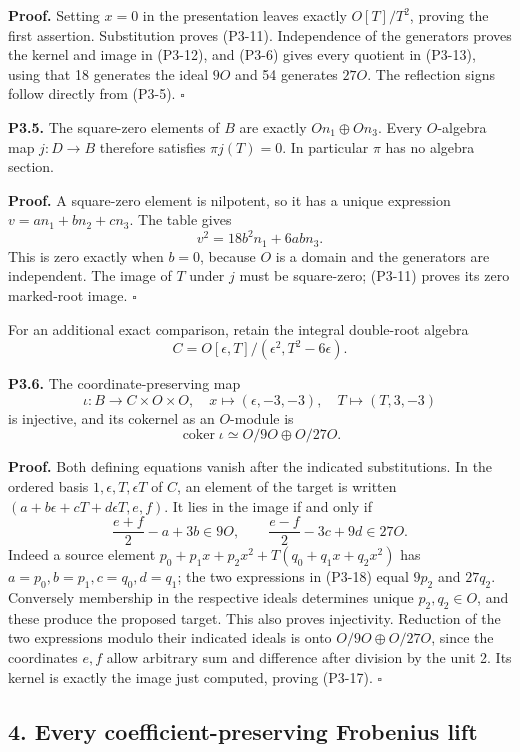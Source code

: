 \documentclass[
]{article}
\begin{document}
\textbf{Proof.} Setting \(x=0\) in the presentation leaves exactly
\(O[T]/T^2\), proving the first assertion. Substitution proves (P3-11).
Independence of the generators proves the kernel and image in (P3-12),
and (P3-6) gives every quotient in (P3-13), using that 18 generates the
ideal \(9O\) and 54 generates \(27O\). The reflection signs follow
directly from (P3-5). \(\square\)

\textbf{P3.5.} The square-zero elements of \(B\) are exactly
\(On_1\oplus On_3\). Every \(O\)-algebra map \(j:D\to B\) therefore
satisfies \(\pi j(T)=0\). In particular \(\pi\) has no algebra section.

\textbf{Proof.} A square-zero element is nilpotent, so it has a unique
expression \(v=an_1+bn_2+cn_3\). The table gives \[
v^2=18b^2n_1+6abn_3.
\tag{P3-14}
\] This is zero exactly when \(b=0\), because \(O\) is a domain and the
generators are independent. The image of \(T\) under \(j\) must be
square-zero; (P3-11) proves its zero marked-root image. \(\square\)

For an additional exact comparison, retain the integral double-root
algebra \[
C=O[\epsilon,T]/(\epsilon^2,T^2-6\epsilon).
\tag{P3-15}
\]

\textbf{P3.6.} The coordinate-preserving map \[
\iota:B\longrightarrow C\times O\times O,
\quad x\longmapsto(\epsilon,-3,-3),\quad
T\longmapsto(T,3,-3)
\tag{P3-16}
\] is injective, and its cokernel as an \(O\)-module is \[
\operatorname{coker}\iota\simeq O/9O\oplus O/27O.
\tag{P3-17}
\]

\textbf{Proof.} Both defining equations vanish after the indicated
substitutions. In the ordered basis \(1,\epsilon,T,\epsilon T\) of
\(C\), an element of the target is written
\((a+b\epsilon+cT+d\epsilon T,e,f)\). It lies in the image if and only
if \[
\frac{e+f}{2}-a+3b\in9O,\qquad
\frac{e-f}{2}-3c+9d\in27O.
\tag{P3-18}
\] Indeed a source element \(p_0+p_1x+p_2x^2+T(q_0+q_1x+q_2x^2)\) has
\(a=p_0,b=p_1,c=q_0,d=q_1\); the two expressions in (P3-18) equal
\(9p_2\) and \(27q_2\). Conversely membership in the respective ideals
determines unique \(p_2,q_2\in O\), and these produce the proposed
target. This also proves injectivity. Reduction of the two expressions
modulo their indicated ideals is onto \(O/9O\oplus O/27O\), since the
coordinates \(e,f\) allow arbitrary sum and difference after division by
the unit 2. Its kernel is exactly the image just computed, proving
(P3-17). \(\square\)

\subsection{4. Every coefficient-preserving Frobenius
lift}\label{every-coefficient-preserving-frobenius-lift}
\end{document}
